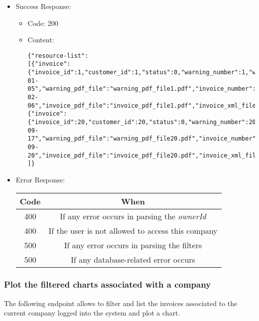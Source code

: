 \begin{itemize}
    \item Success Response:
    \begin{itemize}
        \item Code: 200
        \item Content:
        \begin{lstlisting}
{"resource-list":
[{"invoice":{"invoice_id":1,"customer_id":1,"status":0,"warning_number":1,"warning_date":"2022-01-05","warning_pdf_file":"warning_pdf_file1.pdf","invoice_number":"1","invoice_date":"2022-02-06","invoice_pdf_file":"invoice_pdf_file1.pdf","invoice_xml_file":"invoice_xml_file1.xml","total":168.3,"discount":15.0,"pension_fund_refund":4.1,"has_stamp":false}},
{"invoice":{"invoice_id":20,"customer_id":20,"status":0,"warning_number":20,"warning_date":"2022-09-17","warning_pdf_file":"warning_pdf_file20.pdf","invoice_number":"20","invoice_date":"2022-09-20","invoice_pdf_file":"invoice_pdf_file20.pdf","invoice_xml_file":"invoice_xml_file20.xml","total":71.2,"discount":46.8,"pension_fund_refund":3.2,"has_stamp":false}}
]}
        \end{lstlisting}
    \end{itemize}

    \item Error Response:
    \begin{table}[!h]
    \centering
    \begin{tabular}{|c|c|}
    \hline
    \multicolumn{1}{|c|}{\textbf{Code}} & \multicolumn{1}{c|}{\textbf{When}} \\ \hline
    400 & If any error occurs in parsing the \textit{ownerId}  \\\hline
    400 & If the user is not allowed to access this company \\\hline
    500 & If any error occurs in parsing the filters \\\hline
    500 & If any database-related error occurs \\\hline
    \end{tabular}
    \end{table}

\end{itemize}


\newpage
\subsubsection*{Plot the filtered charts associated with a company}

The following endpoint allows to filter and list the invoices associated to the current company logged into the system and plot a chart.

